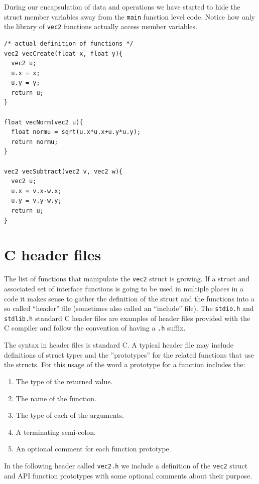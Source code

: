 During our encapsulation of data and operations we have started to hide the struct member variables away from the \texttt{main} function level code. Notice how only the library of \texttt{vec2} functions actually access member variables. 
\begin{verbatim}
/* actual definition of functions */
vec2 vecCreate(float x, float y){
  vec2 u;
  u.x = x;
  u.y = y;
  return u;
}

float vecNorm(vec2 u){
  float normu = sqrt(u.x*u.x+u.y*u.y);
  return normu;
}

vec2 vecSubtract(vec2 v, vec2 w){
  vec2 u;
  u.x = v.x-w.x;
  u.y = v.y-w.y;
  return u;
}
\end{verbatim}

\section{C header files}

The list of functions that manipulate the \texttt{vec2} struct is growing. If a struct and associated set of interface functions  is going to be used in multiple places in a code it makes sense to gather the definition of the struct and the functions into a so called ``header'' file (sometimes also called an ``include'' file). The \texttt{stdio.h} and \texttt{stdlib.h} standard C header files are examples of header files provided with the C compiler and follow the convention of having a \texttt{.h} suffix.

The syntax in header files is standard C. A typical header file may include definitions of struct types and the ''prototypes'' for the related functions that use the structs. For this usage of the word a prototype for a function includes the:

\begin{enumerate}
    \item The type of the returned value.
    \item The name of the function.
    \item The type of each of the arguments.
    \item A terminating semi-colon.
    \item An optional comment for each function prototype.
\end{enumerate}

In the following header called \texttt{vec2.h} we include a definition of the \texttt{vec2} struct and API function prototypes with some optional comments about their purpose.

